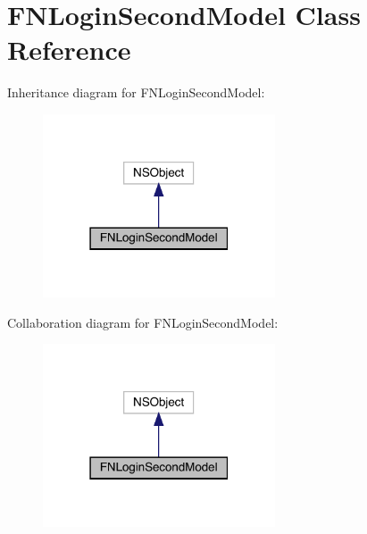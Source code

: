 \hypertarget{interface_f_n_login_second_model}{}\section{F\+N\+Login\+Second\+Model Class Reference}
\label{interface_f_n_login_second_model}


Inheritance diagram for F\+N\+Login\+Second\+Model\+:\nopagebreak
\begin{figure}[H]
\begin{center}
\leavevmode
\includegraphics[width=195pt]{interface_f_n_login_second_model__inherit__graph}
\end{center}
\end{figure}


Collaboration diagram for F\+N\+Login\+Second\+Model\+:\nopagebreak
\begin{figure}[H]
\begin{center}
\leavevmode
\includegraphics[width=195pt]{interface_f_n_login_second_model__coll__graph}
\end{center}
\end{figure}
